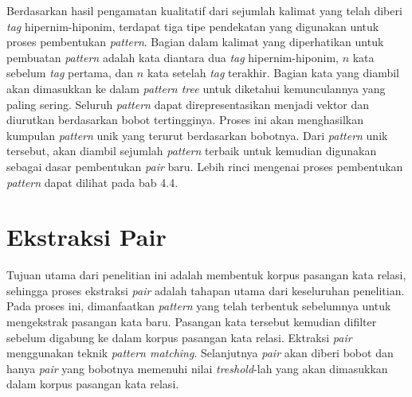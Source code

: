 Berdasarkan hasil pengamatan kualitatif dari sejumlah kalimat yang telah diberi \textit{tag} hipernim-hiponim, terdapat tiga tipe pendekatan yang digunakan untuk proses pembentukan \textit{pattern}. Bagian dalam kalimat yang diperhatikan untuk pembuatan \textit{pattern} adalah kata diantara dua \textit{tag} hipernim-hiponim, $n$ kata sebelum \textit{tag} pertama, dan $n$ kata setelah \textit{tag} terakhir. Bagian kata yang diambil akan dimasukkan ke dalam \textit{pattern tree} untuk diketahui kemunculannya yang paling sering. Seluruh \textit{pattern} dapat direpresentasikan menjadi vektor dan diurutkan berdasarkan bobot tertingginya. Proses ini akan menghasilkan kumpulan \textit{pattern} unik yang terurut berdasarkan bobotnya. Dari \textit{pattern} unik tersebut, akan diambil sejumlah \textit{pattern} terbaik untuk kemudian digunakan sebagai dasar pembentukan \textit{pair} baru. Lebih rinci mengenai proses pembentukan \textit{pattern} dapat dilihat pada bab 4.4.
%


\section{Ekstraksi Pair}
Tujuan utama dari penelitian ini adalah membentuk korpus pasangan kata relasi, sehingga proses ekstraksi \textit{pair} adalah tahapan utama dari keseluruhan penelitian. Pada proses ini, dimanfaatkan \textit{pattern} yang telah terbentuk sebelumnya untuk mengekstrak pasangan kata baru. Pasangan kata tersebut kemudian difilter sebelum digabung ke dalam korpus pasangan kata relasi. Ektraksi \textit{pair} menggunakan teknik \textit{pattern matching}. Selanjutnya \textit{pair} akan diberi bobot dan hanya \textit{pair} yang bobotnya memenuhi nilai \textit{treshold}-lah yang akan dimasukkan dalam korpus pasangan kata relasi.

